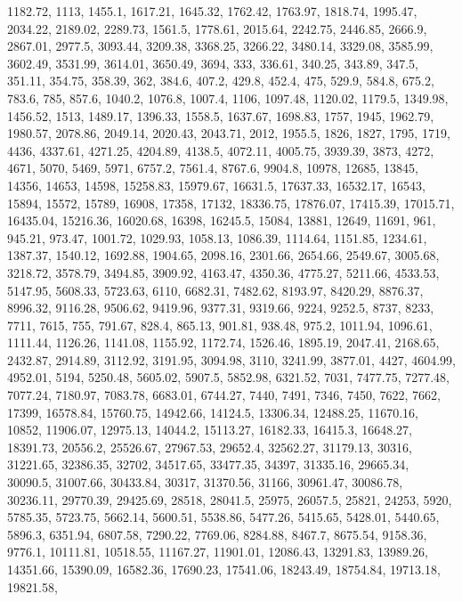 \documentclass[
]{article}
\begin{document}
1182.72, 1113, 1455.1, 1617.21, 1645.32, 1762.42, 1763.97, 1818.74,
1995.47, 2034.22, 2189.02, 2289.73, 1561.5, 1778.61, 2015.64, 2242.75,
2446.85, 2666.9, 2867.01, 2977.5, 3093.44, 3209.38, 3368.25, 3266.22,
3480.14, 3329.08, 3585.99, 3602.49, 3531.99, 3614.01, 3650.49, 3694,
333, 336.61, 340.25, 343.89, 347.5, 351.11, 354.75, 358.39, 362, 384.6,
407.2, 429.8, 452.4, 475, 529.9, 584.8, 675.2, 783.6, 785, 857.6,
1040.2, 1076.8, 1007.4, 1106, 1097.48, 1120.02, 1179.5, 1349.98,
1456.52, 1513, 1489.17, 1396.33, 1558.5, 1637.67, 1698.83, 1757, 1945,
1962.79, 1980.57, 2078.86, 2049.14, 2020.43, 2043.71, 2012, 1955.5,
1826, 1827, 1795, 1719, 4436, 4337.61, 4271.25, 4204.89, 4138.5,
4072.11, 4005.75, 3939.39, 3873, 4272, 4671, 5070, 5469, 5971, 6757.2,
7561.4, 8767.6, 9904.8, 10978, 12685, 13845, 14356, 14653, 14598,
15258.83, 15979.67, 16631.5, 17637.33, 16532.17, 16543, 15894, 15572,
15789, 16908, 17358, 17132, 18336.75, 17876.07, 17415.39, 17015.71,
16435.04, 15216.36, 16020.68, 16398, 16245.5, 15084, 13881, 12649,
11691, 961, 945.21, 973.47, 1001.72, 1029.93, 1058.13, 1086.39, 1114.64,
1151.85, 1234.61, 1387.37, 1540.12, 1692.88, 1904.65, 2098.16, 2301.66,
2654.66, 2549.67, 3005.68, 3218.72, 3578.79, 3494.85, 3909.92, 4163.47,
4350.36, 4775.27, 5211.66, 4533.53, 5147.95, 5608.33, 5723.63, 6110,
6682.31, 7482.62, 8193.97, 8420.29, 8876.37, 8996.32, 9116.28, 9506.62,
9419.96, 9377.31, 9319.66, 9224, 9252.5, 8737, 8233, 7711, 7615, 755,
791.67, 828.4, 865.13, 901.81, 938.48, 975.2, 1011.94, 1096.61, 1111.44,
1126.26, 1141.08, 1155.92, 1172.74, 1526.46, 1895.19, 2047.41, 2168.65,
2432.87, 2914.89, 3112.92, 3191.95, 3094.98, 3110, 3241.99, 3877.01,
4427, 4604.99, 4952.01, 5194, 5250.48, 5605.02, 5907.5, 5852.98,
6321.52, 7031, 7477.75, 7277.48, 7077.24, 7180.97, 7083.78, 6683.01,
6744.27, 7440, 7491, 7346, 7450, 7622, 7662, 17399, 16578.84, 15760.75,
14942.66, 14124.5, 13306.34, 12488.25, 11670.16, 10852, 11906.07,
12975.13, 14044.2, 15113.27, 16182.33, 16415.3, 16648.27, 18391.73,
20556.2, 25526.67, 27967.53, 29652.4, 32562.27, 31179.13, 30316,
31221.65, 32386.35, 32702, 34517.65, 33477.35, 34397, 31335.16,
29665.34, 30090.5, 31007.66, 30433.84, 30317, 31370.56, 31166, 30961.47,
30086.78, 30236.11, 29770.39, 29425.69, 28518, 28041.5, 25975, 26057.5,
25821, 24253, 5920, 5785.35, 5723.75, 5662.14, 5600.51, 5538.86,
5477.26, 5415.65, 5428.01, 5440.65, 5896.3, 6351.94, 6807.58, 7290.22,
7769.06, 8284.88, 8467.7, 8675.54, 9158.36, 9776.1, 10111.81, 10518.55,
11167.27, 11901.01, 12086.43, 13291.83, 13989.26, 14351.66, 15390.09,
16582.36, 17690.23, 17541.06, 18243.49, 18754.84, 19713.18, 19821.58,
\end{document}
